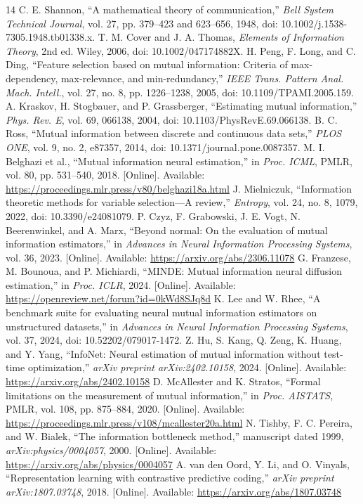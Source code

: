 \documentclass[journal,11pt]{IEEEtran}
\begin{document}
\begin{thebibliography}{14}
 C. E. Shannon, ``A mathematical theory of communication,'' \emph{Bell System Technical Journal}, vol. 27, pp. 379--423 and 623--656, 1948, doi: 10.1002/j.1538-7305.1948.tb01338.x.
 T. M. Cover and J. A. Thomas, \emph{Elements of Information Theory}, 2nd ed. Wiley, 2006, doi: 10.1002/047174882X.
 H. Peng, F. Long, and C. Ding, ``Feature selection based on mutual information: Criteria of max-dependency, max-relevance, and min-redundancy,'' \emph{IEEE Trans. Pattern Anal. Mach. Intell.}, vol. 27, no. 8, pp. 1226--1238, 2005, doi: 10.1109/TPAMI.2005.159.
 A. Kraskov, H. Stogbauer, and P. Grassberger, ``Estimating mutual information,'' \emph{Phys. Rev. E}, vol. 69, 066138, 2004, doi: 10.1103/PhysRevE.69.066138.
 B. C. Ross, ``Mutual information between discrete and continuous data sets,'' \emph{PLOS ONE}, vol. 9, no. 2, e87357, 2014, doi: 10.1371/journal.pone.0087357.
 M. I. Belghazi et al., ``Mutual information neural estimation,'' in \emph{Proc. ICML}, PMLR, vol. 80, pp. 531--540, 2018. [Online]. Available: \url{https://proceedings.mlr.press/v80/belghazi18a.html}
 J. Mielniczuk, ``Information theoretic methods for variable selection---A review,'' \emph{Entropy}, vol. 24, no. 8, 1079, 2022, doi: 10.3390/e24081079.
 P. Czyz, F. Grabowski, J. E. Vogt, N. Beerenwinkel, and A. Marx, ``Beyond normal: On the evaluation of mutual information estimators,'' in \emph{Advances in Neural Information Processing Systems}, vol. 36, 2023. [Online]. Available: \url{https://arxiv.org/abs/2306.11078}
 G. Franzese, M. Bounoua, and P. Michiardi, ``MINDE: Mutual information neural diffusion estimation,'' in \emph{Proc. ICLR}, 2024. [Online]. Available: \url{https://openreview.net/forum?id=0kWd8SJq8d}
 K. Lee and W. Rhee, ``A benchmark suite for evaluating neural mutual information estimators on unstructured datasets,'' in \emph{Advances in Neural Information Processing Systems}, vol. 37, 2024, doi: 10.52202/079017-1472.
 Z. Hu, S. Kang, Q. Zeng, K. Huang, and Y. Yang, ``InfoNet: Neural estimation of mutual information without test-time optimization,'' \emph{arXiv preprint arXiv:2402.10158}, 2024. [Online]. Available: \url{https://arxiv.org/abs/2402.10158}
 D. McAllester and K. Stratos, ``Formal limitations on the measurement of mutual information,'' in \emph{Proc. AISTATS}, PMLR, vol. 108, pp. 875--884, 2020. [Online]. Available: \url{https://proceedings.mlr.press/v108/mcallester20a.html}
 N. Tishby, F. C. Pereira, and W. Bialek, ``The information bottleneck method,'' manuscript dated 1999, \emph{arXiv:physics/0004057}, 2000. [Online]. Available: \url{https://arxiv.org/abs/physics/0004057}
 A. van den Oord, Y. Li, and O. Vinyals, ``Representation learning with contrastive predictive coding,'' \emph{arXiv preprint arXiv:1807.03748}, 2018. [Online]. Available: \url{https://arxiv.org/abs/1807.03748}
\end{thebibliography}
\end{document}
